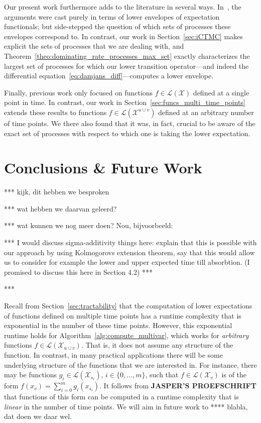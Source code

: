 \documentclass[10pt,a4paper]{paper}
\theoremstyle{definition}
\newcommand{\states}{\mathcal{X}}
\newcommand{\gambles}{\mathcal{L}}
\newcommand{\gamblesX}{\gambles(\states)}
\begin{document}
Our present work furthermore adds to the literature in several ways. In~\cite{Skulj:2015cq}, the arguments were cast purely in terms of lower envelopes of expectation functionals; but side-stepped the question of which sets of processes these envelopes correspond to. In contrast, our work in Section~\ref{sec:iCTMC} makes explicit the sets of processes that we are dealing with, and Theorem~\ref{theo:dominating_rate_processes_max_set} exactly characterizes the largest set of processes for which our lower transition operator---and indeed the differential equation~\eqref{eq:damjans_diff}---computes a lower envelope.

Finally, previous work only focused on functions $f\in\gamblesX$ defined at a single point in time. In contrast, our work in Section~\ref{sec:funcs_multi_time_points} extends these results to functions $f\in\gambles(\states^{u\cup v})$ defined at an arbitrary number of time points. We there also found that it was, in fact, crucial to be aware of the exact set of processes with respect to which one is taking the lower expectation.

\section{Conclusions \& Future Work}\label{sec:conclusions}

*** kijk, dit hebben we besproken

*** wat hebben we daarvan geleerd?

*** wat kunnen we nog meer doen? Nou, bijvoorbeeld:

*** I would discuss sigma-additivity things here: explain that this is possible with our approach by using Kolmogorovs extension theorem, say that this would allow us to consider for example the lower and upper expected time till absorbtion. (I promised to discuss this here in Section 4.2) ***

***

Recall from Section~\ref{sec:tractability} that the computation of lower expectations of functions defined on multiple time points has a runtime complexity that is exponential in the number of these time points. However, this exponential runtime holds for Algorithm~\ref{alg:compute_multivar}, which works for \emph{arbitrary} functions $f\in\gambles(\states_{u\cup v})$. That is, it does not assume any structure of the function. In contrast, in many practical applications there will be some underlying structure of the functions that we are interested in. For instance, there may be functions $g_i\in\gambles(\states_{s_i})$, $i\in\{0,\ldots,m\}$, such that $f\in\gambles(\states_v)$ is of the form $f(x_v) = \sum_{i=0}^m g_i(x_{s_i})$. It follows from {\bf JASPER'S PROEFSCHRIFT} that functions of this form can be computed in a runtime complexity that is \emph{linear} in the number of time points. We will aim in future work to **** blabla, dat doen we daar wel.
\end{document}
